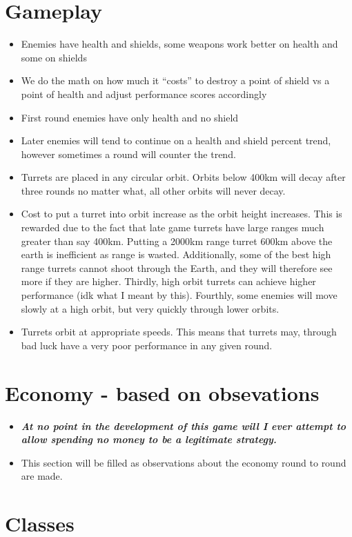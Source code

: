 \documentclass[12pt]{article}
\begin{document}
\section*{Gameplay}
\begin{itemize}
\item Enemies have health and shields, some weapons work better on health and
some on shields
\item We do the math on how much it ``costs'' to destroy a point of shield vs
a point of health and adjust performance scores accordingly
\item First round enemies have only health and no shield
\item Later enemies will tend to continue on a health and shield percent trend,
however sometimes a round will counter the trend.
\item Turrets are placed in any circular orbit. Orbits below 400km will decay
after three rounds no matter what, all other orbits will never decay.
\item Cost to put a turret into orbit increase as the orbit height increases.
This is rewarded due to the fact that late game turrets have large ranges much
greater than say 400km. Putting a 2000km range turret 600km above the earth is
inefficient as range is wasted. Additionally, some of the best high range
turrets cannot shoot through the Earth, and they will therefore see more if
they are higher. Thirdly, high orbit turrets can achieve higher performance
(idk what I meant by this). Fourthly, some enemies will move slowly at a high
orbit, but very quickly through lower orbits.
\item Turrets orbit at appropriate speeds. This means that turrets may,
through bad luck have a very poor performance in any given round.
\end{itemize}

\section*{Economy - based on obsevations}
\begin{itemize}
\item \textbf{\textit{At no point in the development of this game will I ever
attempt to allow spending no money to be a legitimate strategy.}}
\item This section will be filled as observations about the economy round to
round are made.
\end{itemize}


\section*{Classes}
\end{document}
